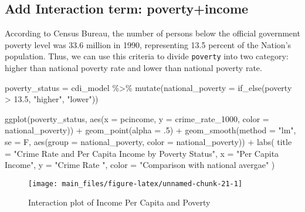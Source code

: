 \documentclass[
  11pt,
]{article}
\newenvironment{Shaded}{\begin{snugshade}}{\end{snugshade}}
\newcommand{\AttributeTok}[1]{\textcolor[rgb]{0.77,0.63,0.00}{#1}}
\newcommand{\DecValTok}[1]{\textcolor[rgb]{0.00,0.00,0.81}{#1}}
\newcommand{\FloatTok}[1]{\textcolor[rgb]{0.00,0.00,0.81}{#1}}
\newcommand{\FunctionTok}[1]{\textcolor[rgb]{0.00,0.00,0.00}{#1}}
\newcommand{\NormalTok}[1]{#1}
\newcommand{\OtherTok}[1]{\textcolor[rgb]{0.56,0.35,0.01}{#1}}
\newcommand{\SpecialCharTok}[1]{\textcolor[rgb]{0.00,0.00,0.00}{#1}}
\newcommand{\StringTok}[1]{\textcolor[rgb]{0.31,0.60,0.02}{#1}}
\begin{document}
\hypertarget{add-interaction-term-povertyincome}{%
\subsection{Add Interaction term:
poverty+income}\label{add-interaction-term-povertyincome}}

According to Census Bureau, the number of persons below the official
government poverty level was 33.6 million in 1990, representing 13.5
percent of the Nation's population. Thus, we can use this criteria to
divide \texttt{poverty} into two category: higher than national poverty
rate and lower than national poverty rate.

\begin{Shaded}
\begin{Highlighting}[]
\NormalTok{poverty\_status }\OtherTok{=}\NormalTok{ cdi\_model }\SpecialCharTok{\%\textgreater{}\%} 
  \FunctionTok{mutate}\NormalTok{(}\AttributeTok{national\_poverty =} \FunctionTok{if\_else}\NormalTok{(poverty }\SpecialCharTok{\textgreater{}} \FloatTok{13.5}\NormalTok{, }\StringTok{"higher"}\NormalTok{, }\StringTok{"lower"}\NormalTok{))}

\FunctionTok{ggplot}\NormalTok{(poverty\_status, }\FunctionTok{aes}\NormalTok{(}\AttributeTok{x =}\NormalTok{ pcincome, }\AttributeTok{y =}\NormalTok{ crime\_rate\_1000, }\AttributeTok{color =}\NormalTok{ national\_poverty)) }\SpecialCharTok{+} 
  \FunctionTok{geom\_point}\NormalTok{(}\AttributeTok{alpha =}\NormalTok{ .}\DecValTok{5}\NormalTok{) }\SpecialCharTok{+}
  \FunctionTok{geom\_smooth}\NormalTok{(}\AttributeTok{method =} \StringTok{"lm"}\NormalTok{, }\AttributeTok{se =}\NormalTok{ F, }\FunctionTok{aes}\NormalTok{(}\AttributeTok{group =}\NormalTok{ national\_poverty, }\AttributeTok{color =}\NormalTok{ national\_poverty)) }\SpecialCharTok{+}
  \FunctionTok{labs}\NormalTok{(}
    \AttributeTok{title =} \StringTok{"Crime Rate and Per Capita Income by Poverty Status"}\NormalTok{,}
    \AttributeTok{x =} \StringTok{"Per Capita Income"}\NormalTok{,}
    \AttributeTok{y =} \StringTok{"Crime Rate "}\NormalTok{,}
    \AttributeTok{color =} \StringTok{"Comparison with national avergae"}
\NormalTok{  )}
\end{Highlighting}
\end{Shaded}

\begin{figure}
\texttt{[image: main\_files/figure-latex/unnamed-chunk-21-1]} \caption{\label{fig:figs}Interaction plot of Income Per Capita and Poverty}\label{fig:unnamed-chunk-21}
\end{figure}
\end{document}
